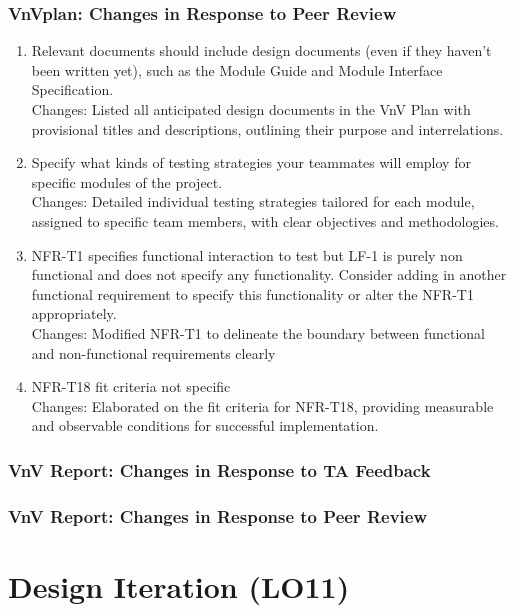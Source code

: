 \documentclass{article}
\begin{document}
\subsubsection{VnVplan: Changes in Response to Peer Review}
\begin{enumerate}
        \item Relevant documents should include design documents (even if they 
        haven't been written yet), such as the Module Guide and Module Interface 
        Specification.\\
        Changes: Listed all anticipated design documents in the VnV Plan with provisional titles and descriptions, outlining their purpose and interrelations.
        \item Specify what kinds of testing strategies your teammates will employ 
        for specific modules of the project.\\
        Changes: Detailed individual testing strategies tailored for each module, assigned to specific team members, with clear objectives and methodologies.
        \item NFR-T1 specifies functional interaction to test but LF-1 is purely 
        non functional and does not specify any functionality. Consider adding 
        in another functional requirement to specify this functionality or alter 
        the NFR-T1 appropriately.\\
        Changes: Modified NFR-T1 to delineate the boundary between functional and non-functional requirements clearly
        \item NFR-T18 fit criteria not specific\\
        Changes: Elaborated on the fit criteria for NFR-T18, providing measurable and observable conditions for successful implementation.
\end{enumerate} 
\subsubsection{VnV Report: Changes in Response to TA Feedback}

\subsubsection{VnV Report: Changes in Response to Peer Review}


\section{Design Iteration (LO11)}
\end{document}
